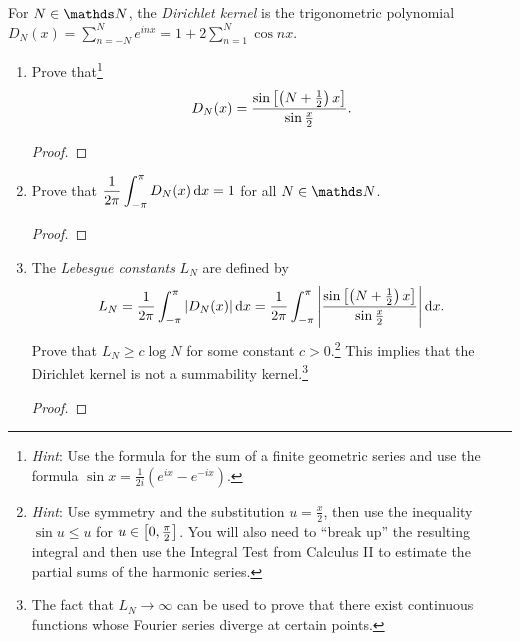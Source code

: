 \documentclass{../homework}
\begin{document}
\begin{Exercise}
  For \(N \in \N\), the \emph{Dirichlet kernel} is the trigonometric
  polynomial
  \(D_N(x) = \sum_{n=-N}^N e^{inx} = 1 + 2 \sum_{n=1}^N \cos nx\).
  \begin{enumerate}
  \item Prove that\footnote{\emph{Hint}: Use the formula for the sum
      of a finite geometric series and use the formula
      \(\sin x = \frac{1}{2i} (e^{ix} - e^{-ix})\).}
    \begin{equation}
      \label{eq-Dirichlet}
      D_N(x)
      = \frac{\sin\left[ {\left( {N + \frac 1 2} \right) x} \right]}{\sin \frac x 2}.
    \end{equation}

    \begin{solution}
      \begin{proof}

      \end{proof}
    \end{solution}

  \item Prove that
    \(\displaystyle \frac{1}{2\pi} \int_{-\pi}^{\pi} D_N(x) \mathop{}\! \mathrm d x =
    1\) for all \(N \in \N\).

    \begin{solution}
      \begin{proof}

      \end{proof}
    \end{solution}

  \item The \emph{Lebesgue constants} \(L_N\) are defined by
    \begin{equation*}
      L_N
      = \frac{1}{2\pi} \int_{-\pi}^{\pi} \left\lvert {D_N(x)} \right\rvert \mathop{}\! \mathrm d x
      = \frac{1}{2\pi} \int_{-\pi}^{\pi}
      \left\lvert {\frac{\sin\left[ {\left( {N + \frac 1 2} \right)x} \right]}
        {\sin \frac x 2}} \right\rvert \mathop{}\! \mathrm d x.
    \end{equation*}
    Prove that \(L_N \geq c \log N\) for some constant
    \(c > 0\).\footnote{\emph{Hint}: Use symmetry and the substitution
      \(u = \frac x 2\), then use the inequality \(\sin u \leq u\) for
      \(u \in \left[ {0,\frac \pi 2} \right]\).  You will also need to
      ``break up'' the resulting integral and then use the Integral
      Test from Calculus II to estimate the partial sums of the
      harmonic series.}  This implies that the Dirichlet kernel is not
    a summability kernel.\footnote{The fact that \(L_N \to \infty\)
      can be used to prove that there exist continuous functions whose
      Fourier series diverge at certain points.}

    \begin{solution}
      \begin{proof}

      \end{proof}
    \end{solution}
  \end{enumerate}
\end{Exercise}
\end{document}
